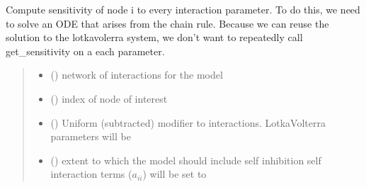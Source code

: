 \documentclass[letterpaper,10pt,english]{sphinxmanual}
\begin{document}

\begin{fulllineitems}
\label{\detokenize{sensit:sensitivity.get_all_sensitivity_single_trajectory}}
\pysigstartsignatures
{}
\pysigstopsignatures
\sphinxAtStartPar
Compute sensitivity of node i to every interaction parameter. To do this, we need to solve an ODE that arises from the chain rule. Because we can reuse the solution to the lotka\sphinxhyphen{}volerra
system, we don’t want to repeatedly call get\_sensitivity on a each parameter.
\begin{quote}\begin{description}
\begin{itemize}
\item {} 
\sphinxAtStartPar
{} ({\hyperref[\detokenize{friendlynets:friendlyNet.friendlyNet}]{}}) \textendash{} network of interactions for the model

\item {} 
\sphinxAtStartPar
{} () \textendash{} index of node of interest

\item {} 
\sphinxAtStartPar
{} () \textendash{} Uniform (subtracted) modifier to interactions. Lotka\sphinxhyphen{}Volterra parameters will be {\hyperref[\detokenize{friendlynets:friendlyNet.friendlyNet.Adjacency}]{}} \sphinxhyphen{} 

\item {} 
\sphinxAtStartPar
{} () \textendash{} extent to which the model should include self inhibition \sphinxhyphen{} self interaction terms (\(a_{ii}\)) will be set to \sphinxhyphen{}


\end{itemize}
\end{description}
\end{quote}
\end{fulllineitems}
\end{document}

